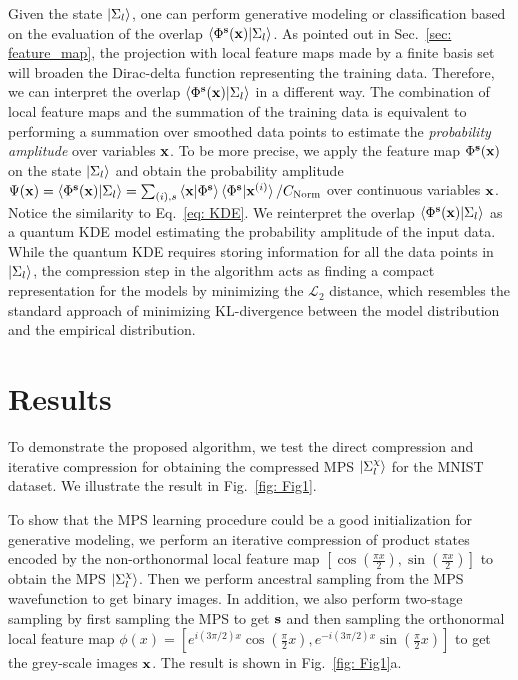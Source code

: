 \documentclass[nonatbib]{article}
\begin{document}
Given the state $\ket{\Sigma_l}$, one can perform generative modeling or classification based on the evaluation of the overlap $\braket{\Phi^{\bf s}({\bf x})|\Sigma_l}$.
As pointed out in Sec.~\ref{sec: feature_map}, the projection with local feature maps made by a finite basis set will broaden the Dirac-delta function representing the training data.
Therefore, we can interpret the overlap $\braket{\Phi^{\bf s}({\bf x})|\Sigma_l}$ in a different way.
The combination of local feature maps and the summation of the training data is equivalent to performing a summation over smoothed data points to estimate the \emph{probability amplitude} over variables ${\bf x}$. 
To be more precise, we apply the feature map $\Phi^{\bf s}({\bf x})$ on the state $\ket{\Sigma_l}$ and obtain the probability amplitude $\Psi({\bf x}) = \braket{\Phi^{\bf s}({\bf x})|\Sigma_l} = \sum_{(i), s} \braket{{\bf x}|\Phi^{{\bf s}}}\braket{\Phi^{{\bf s}}|{\bf x}^{(i)}} / C_\text{Norm}$ over continuous variables ${\bf x}$.
Notice the similarity to Eq.~\eqref{eq: KDE}.
We reinterpret the overlap $\braket{\Phi^{\bf s}({\bf x})|\Sigma_l}$ as a quantum KDE model estimating the probability amplitude of the input data.
While the quantum KDE requires storing information for all the data points in $\ket{\Sigma_l}$, the compression step in the algorithm acts as finding a compact representation for the models by minimizing the $\mathcal{L}_2$ distance, which resembles the standard approach of minimizing KL-divergence between the model distribution and the empirical distribution.

    

    

 
    


    
    
    
    
    
    
    





\section{\label{sec: Result} Results}

To demonstrate the proposed algorithm, we test the direct compression and iterative compression for obtaining the compressed MPS $\ket{\Sigma^\chi_l}$ for the MNIST dataset. We illustrate the result in Fig.~\ref{fig: Fig1}.


To show that the MPS learning procedure could be a good initialization for generative modeling, we perform an iterative compression of product states encoded by the non-orthonormal local feature map $[\cos(\frac{\pi x}{2}), \sin(\frac{\pi x}{2})]$ to obtain the MPS $\ket{\Sigma^\chi_l}$.
Then we perform ancestral sampling from the MPS wavefunction to get binary images. In addition, we also perform two-stage sampling by first sampling the MPS to get ${\bf s}$ and then sampling the orthonormal local feature map $\phi(x) = [e^{i(3\pi/2)x}\cos(\frac{\pi}{2}x), e^{-i(3\pi/2)x}\sin(\frac{\pi}{2}x)]$ to get the grey-scale images ${\bf x}$. %
The result is shown in Fig.~\ref{fig: Fig1}a. 
    
\end{document}
